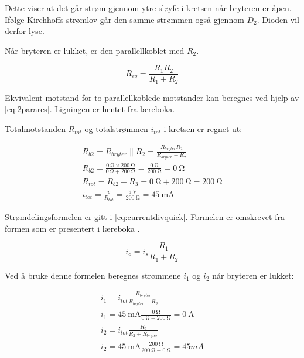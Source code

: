 \documentclass[11pt,a4paper,twocolumn]{article}
\begin{document}
Dette viser at det går strøm gjennom ytre sløyfe i kretsen når bryteren er åpen. Ifølge Kirchhoffs
strømlov går den samme strømmen også gjennom $D_2$. Dioden vil derfor lyse.

\medskip

Når bryteren er lukket, er den parallellkoblet med $R_2$. 

\begin{equation}
	R_{eq} = \frac{R_1R_2}{R_1+R_2}
	\label{eq:2parares}
\end{equation}

Ekvivalent motstand for to parallellkoblede motstander kan beregnes ved hjelp av \cref{eq:2parares}. Ligningen er hentet fra læreboka\cite{laerebok}.

Totalmotstanden $R_{tot}$ og totalstrømmen $i_{tot}$ i kretsen er regnet ut:

$$
\begin{gathered}
R_{b2} = R_{bryter} \parallel R_{2} = \frac{R_{bryter}R_2}{R_{bryter}+R_2} \\
R_{b2} = \frac{\qty{0}{\ohm} \times \qty{200}{\ohm}}{\qty{0}{\ohm}+\qty{200}{\ohm}} = \frac{\qty{0}{\ohm}}{\qty{200}{\ohm}} = \qty{0}{\ohm} \\
R_{tot} = R_{b2} + R_3 = \qty{0}{\ohm} + \qty{200}{\ohm} = \qty{200}{\ohm} \\
i_{tot} = \frac{v}{R_{tot}} = \frac{\qty{9}{\volt}}{\qty{200}{\ohm}} = \qty{45}{\milli\ampere}
\end{gathered}
$$

Strømdelingsformelen er gitt i \cref{eq:currentdivquick}. Formelen er omskrevet fra formen som er presentert i læreboka \cite{laerebok}.

\begin{equation}
	i_o = i_s \frac{R_1}{R_1+R_2}
	\label{eq:currentdivquick}
\end{equation}

Ved å bruke denne formelen beregnes strømmene $i_1$ og $i_2$ når bryteren er lukket:

$$
\begin{gathered}
i_1 = i_{tot} \frac{R_{bryter}}{R_{bryter} + R_2} \\
i_1 = \qty{45}{\milli\ampere}\frac{\qty{0}{\ohm}}{\qty{0}{\ohm} + \qty{200}{\ohm}} = \qty{0}{\ampere} \\
i_2 = i_{tot} \frac{R_2}{R_2 + R_{bryter}} \\
i_2 = \qty{45}{\milli\ampere}\frac{\qty{200}{\ohm}}{\qty{200}{\ohm} + \qty{0}{\ohm}} = 45mA
\end{gathered}
$$
\end{document}
